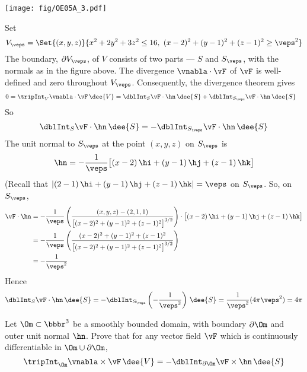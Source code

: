 \begin{solution}
\begin{center}
       \texttt{[image: fig/OE05A\_3.pdf]}
\end{center}

\noindent Set
\begin{equation*}
V_\veps=\Set{(x,y,z)}{x^2+2y^2+3z^2\le 16,\ 
                (x-2)^2 + (y-1)^2 +(z-1)^2\ge\veps^2}
\end{equation*}
The boundary, $\partial V_\veps$, of $V$ consists of two parts ---
$S$ and $S_\veps$, with the normals as in the figure above. The divergence
$\vnabla\cdot\vF$ of $\vF$ is well-defined and zero throughout $V_\veps$.
Consequently, the divergence theorem gives
\begin{align*}
0 &= \tripInt_V\vnabla\cdot\vF\,\dee{V}
   = \dblInt_S \vF\cdot\hn\,\dee{S} 
      + \dblInt_{S_\veps} \vF\cdot\hn\,\dee{S}
\end{align*}
So
\begin{equation*}
\dblInt_S \vF\cdot\hn\,\dee{S} = -\dblInt_{S_\veps} \vF\cdot\hn\,\dee{S}
\end{equation*}
The unit normal to $S_\veps$ at the point $(x,y,z)$ on $S_\veps$ is
\begin{equation*}
\hn =-\frac{1}{\veps}\big[(x-2)\,\hi + (y-1)\,\hj +(z-1)\,\hk\big]
\end{equation*}
(Recall that $|(2-1)\,\hi + (y-1)\,\hj +(z-1)\,\hk|=\veps$ on $S_\veps$.
So, on $S_\veps$,
\begin{align*}
\vF\cdot\hn 
&= -\frac{1}{\veps}
  \left(\frac{(x,y,z)-(2,1,1)}{{\big[(x-2)^2+(y-1)^2+(z-1)^2\big]}^{3/2}}\right)
  \cdot\big[(x-2)\,\hi + (y-1)\,\hj +(z-1)\,\hk\big] \\
&=-\frac{1}{\veps} \left(\frac{(x-2)^2+(y-1)^2+(z-1)^2}{{\big[(x-2)^2+(y-1)^2+(z-1)^2\big]
                                                        }^{3/2}}\right)\\
&= -\frac{1}{\veps^2}
\end{align*}
Hence
\begin{align*}
\dblInt_S \vF\cdot\hn\,\dee{S} 
= -\dblInt_{S_\veps}   \left(-\frac{1}{\veps^2}\right)\,\dee{S}
=\frac{1}{\veps^2} (4\pi\veps^2)
=4\pi
\end{align*}

\end{solution}

\begin{question}[M317 2005A] %
Let $\Om\subset\bbbr^3$ be a smoothly bounded domain, with boundary $\partial\Om$ and outer unit normal $\hn$. Prove that for any vector field $\vF$ which is continuously differentiable in $\Om\cup\partial\Om$,
\begin{equation*}
\tripInt_\Om \vnabla\times\vF\,\dee{V}
   = -\dblInt_{\partial\Om} \vF\times\hn\,\dee{S}
\end{equation*}
\end{question}

